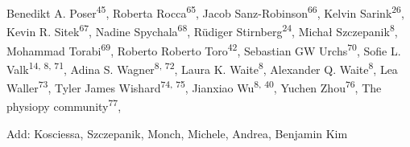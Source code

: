 \documentclass[10pt,a4paper,twocolumns]{proc}
\begin{document}
{Benedikt A. Poser\textsuperscript{45}, %
Roberta Rocca\textsuperscript{65}, %
Jacob Sanz-Robinson\textsuperscript{66}, %
Kelvin Sarink\textsuperscript{26}, %
Kevin R. Sitek\textsuperscript{67}, %
Nadine Spychala\textsuperscript{68}, %
Rüdiger Stirnberg\textsuperscript{24}, %
Michał Szczepanik\textsuperscript{8}, %
Mohammad Torabi\textsuperscript{69}, %
Roberto Roberto Toro\textsuperscript{42}, %
Sebastian GW Urchs\textsuperscript{70}, %
Sofie L. Valk\textsuperscript{14, 8, 71}, %
Adina S. Wagner\textsuperscript{8, 72}, %
Laura K. Waite\textsuperscript{8}, %
Alexander Q. Waite\textsuperscript{8}, %
Lea Waller\textsuperscript{73}, %
Tyler James Wishard\textsuperscript{74, 75}, %
Jianxiao Wu\textsuperscript{8, 40}, %
Yuchen Zhou\textsuperscript{76}, %
The physiopy community\textsuperscript{77}, %


Add: Kosciessa, Szczepanik, Monch, Michele, Andrea, Benjamin Kim

}
\\
\end{document}

